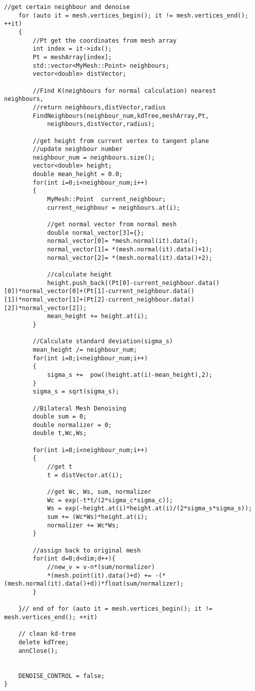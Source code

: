 \begin{enumerate}[1.]
\begin{lstlisting}[xleftmargin=0em]
	//get certain neighbour and denoise
	for (auto it = mesh.vertices_begin(); it != mesh.vertices_end(); ++it)
	{   
		//Pt get the coordinates from mesh array
		int index = it->idx();
		Pt = meshArray[index];
		std::vector<MyMesh::Point> neighbours;
		vector<double> distVector;

		//Find K(neighbours for normal calculation) nearest neighbours, 
		//return neighbours,distVector,radius
		FindNeighbours(neighbour_num,kdTree,meshArray,Pt,
			neighbours,distVector,radius);

		//get height from current vertex to tangent plane
		//update neighbour number
		neighbour_num = neighbours.size();
		vector<double> height;
		double mean_height = 0.0;
		for(int i=0;i<neighbour_num;i++)
		{
			MyMesh::Point  current_neighbour;
			current_neighbour = neighbours.at(i);

			//get normal vector from normal mesh
			double normal_vector[3]={};
			normal_vector[0]= *mesh.normal(it).data();
			normal_vector[1]= *(mesh.normal(it).data()+1);
			normal_vector[2]= *(mesh.normal(it).data()+2);

			//calculate height
			height.push_back((Pt[0]-current_neighbour.data()[0])*normal_vector[0]+(Pt[1]-current_neighbour.data()[1])*normal_vector[1]+(Pt[2]-current_neighbour.data()[2])*normal_vector[2]);
			mean_height += height.at(i);
		}

		//Calculate standard deviation(sigma_s)
		mean_height /= neighbour_num;
		for(int i=0;i<neighbour_num;i++)
		{
			sigma_s +=  pow((height.at(i)-mean_height),2);
		}
		sigma_s = sqrt(sigma_s);

		//Bilateral Mesh Denoising
		double sum = 0;
		double normalizer = 0;
		double t,Wc,Ws;

		for(int i=0;i<neighbour_num;i++)
		{
			//get t
			t = distVector.at(i);

			//get Wc, Ws, sum, normalizer
			Wc = exp(-t*t/(2*sigma_c*sigma_c));
			Ws = exp(-height.at(i)*height.at(i)/(2*sigma_s*sigma_s));
			sum += (Wc*Ws)*height.at(i);
			normalizer += Wc*Ws;
		}

		//assign back to original mesh
		for(int d=0;d<dim;d++){
			//new_v = v-n*(sum/normalizer)
			*(mesh.point(it).data()+d) += -(*(mesh.normal(it).data()+d))*float(sum/normalizer);
		}

	}// end of for (auto it = mesh.vertices_begin(); it != mesh.vertices_end(); ++it)

	// clean kd-tree
	delete kdTree;
	annClose(); 


	DENOISE_CONTROL = false;
}
\end{lstlisting}


\end{enumerate}
